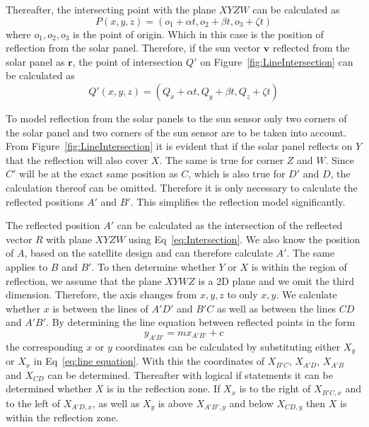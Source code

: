 \documentclass[letterpaper, 10 pt, conference]{ieeeconf}  %
\begin{document}
Thereafter, the intersecting point with the plane $XYZW$ can be calculated as
\begin{equation}
	P(x, y, z) = (o_1 + \alpha t, o_2 + \beta t, o_3 + \zeta t)
	\label{eq:Intersection}
\end{equation}
where $o_1, o_2, o_3$ is the point of origin. Which in this case is the position of reflection from the solar panel. Therefore, if the sun vector $\mathbf{v}$ reflected from the solar panel as $\mathbf{r}$, the point of intersection $Q'$ on Figure~\ref{fig:LineIntersection} can be calculated as
\begin{equation}
	Q'(x, y, z) = (Q_x + \alpha t, Q_y + \beta t, Q_z + \zeta t)
	\label{eq:SpecificIntersection}
\end{equation}

To model reflection from the solar panels to the sun sensor only two corners of the solar panel and two corners of the sun sensor are to be taken into account. From Figure~\ref{fig:LineIntersection} it is evident that if the solar panel reflects on $Y$ that the reflection will also cover $X$. The same is true for corner $Z$ and $W$. Since $C'$ will be at the exact same position as $C$, which is also true for $D'$ and $D$, the calculation thereof can be omitted. Therefore it is only necessary to calculate the reflected positions $A'$ and $B'$. This simplifies the reflection model significantly.

The reflected position $A'$ can be calculated as the intersection of the reflected vector $R$ with plane $XYZW$ using Eq~\ref{eq:Intersection}. We also know the position of $A$, based on the satellite design and can therefore calculate $A'$. The same applies to $B$ and $B'$. To then determine whether $Y$ or $X$ is within the region of reflection, we assume that the plane $XYWZ$ is a 2D plane and we omit the third dimension. Therefore, the axis changes from $x, y, z$ to only $x, y$. We calculate whether $x$ is between the lines of $A'D'$ and $B'C$ as well as between the lines $CD$ and $A'B'$. By determining the line equation between reflected points in the form 
\begin{equation}
y_{A'B'} = mx_{A'B'} + c
\label{eq:line equation}
\end{equation}
the corresponding $x$ or $y$ coordinates can be calculated by substituting either $X_y$ or $X_x$ in Eq~\ref{eq:line equation}. With this the coordinates of $X_{B'C}$, $X_{A'D}$, $X_{A'B}$ and $X_{CD}$ can be determined. Thereafter with logical if statements it can be determined whether $X$ is in the reflection zone. If $X_x$ is to the right of $X_{B'C,x}$ and to the left of $X_{A'D,x}$, as well as $X_y$ is above $X_{A'B',y}$ and below $X_{CD,y}$ then $X$ is within the reflection zone. 
\end{document}
